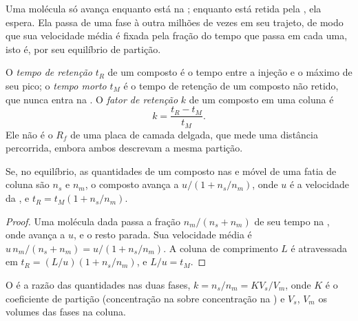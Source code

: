 Uma molécula só avança enquanto está na ; enquanto está retida pela , ela
espera. Ela passa de uma fase à outra milhões de vezes em seu trajeto, de modo que sua velocidade média
é fixada pela fração do tempo que passa em cada uma, isto é, por seu equilíbrio de partição.

\begin{definition}[Retenção]\label{def:b2:chromatography:retention}
O \emph{tempo de retenção} $t_R$ de um composto é o tempo entre a injeção e o
máximo de seu pico; o \emph{tempo morto} $t_M$ é o tempo de retenção de um composto
não retido, que nunca entra na . O \emph{fator de retenção}
$k$ de um composto em uma coluna é
\begin{equation*}
k = \frac{t_R - t_M}{t_M}.
\end{equation*}
Ele não é o $R_f$ de uma placa de camada delgada, que mede uma distância percorrida, embora ambos
descrevam a mesma partição.
\end{definition}

\begin{proposition}\label{prop:b2:chromatography:retention-time}
Se, no equilíbrio, as quantidades de um composto nas  e móvel de uma fatia de coluna
são $n_s$ e $n_m$, o composto avança a $u/(1 + n_s/n_m)$, onde $u$ é a velocidade da ,
e $t_R = t_M(1 + n_s/n_m)$.
\end{proposition}

\begin{proof}
Uma molécula dada passa a fração $n_m/(n_s + n_m)$ de seu tempo na , onde avança a
$u$, e o resto parada. Sua velocidade média é $u\,n_m/(n_s + n_m) = u/(1 + n_s/n_m)$. A coluna de
comprimento $L$ é atravessada em $t_R = (L/u)(1 + n_s/n_m)$, e $L/u = t_M$.
\end{proof}

\begin{proposition}\label{prop:b2:chromatography:k-and-K}
O  é a razão das quantidades nas duas fases, $k = n_s/n_m = KV_s/V_m$, onde $K$
é o coeficiente de partição (concentração na  sobre concentração na ) e $V_s$, $V_m$ os volumes das fases na coluna.
\end{proposition}

